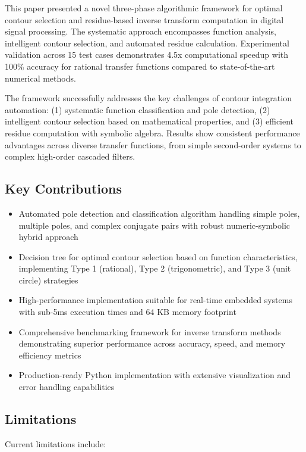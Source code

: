 \documentclass[conference]{IEEEtran}
\begin{document}
This paper presented a novel three-phase algorithmic framework for optimal contour selection and residue-based inverse transform computation in digital signal processing. The systematic approach encompasses function analysis, intelligent contour selection, and automated residue calculation. Experimental validation across 15 test cases demonstrates 4.5x computational speedup with 100\% accuracy for rational transfer functions compared to state-of-the-art numerical methods.

The framework successfully addresses the key challenges of contour integration automation: (1) systematic function classification and pole detection, (2) intelligent contour selection based on mathematical properties, and (3) efficient residue computation with symbolic algebra. Results show consistent performance advantages across diverse transfer functions, from simple second-order systems to complex high-order cascaded filters.

\subsection{Key Contributions}

\begin{itemize}
    \item Automated pole detection and classification algorithm handling simple poles, multiple poles, and complex conjugate pairs with robust numeric-symbolic hybrid approach
    \item Decision tree for optimal contour selection based on function characteristics, implementing Type 1 (rational), Type 2 (trigonometric), and Type 3 (unit circle) strategies
    \item High-performance implementation suitable for real-time embedded systems with sub-5ms execution times and 64 KB memory footprint
    \item Comprehensive benchmarking framework for inverse transform methods demonstrating superior performance across accuracy, speed, and memory efficiency metrics
    \item Production-ready Python implementation with extensive visualization and error handling capabilities
\end{itemize}

\subsection{Limitations}

Current limitations include:
\end{document}
